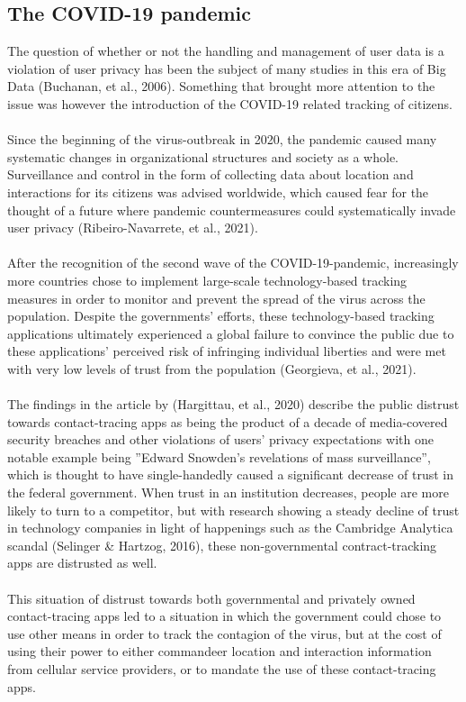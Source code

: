 \documentclass[11pt]{article}
\begin{document}
\subsection{The COVID-19 pandemic}
The question of whether or not the handling and management of user data is a violation of user privacy has been the subject of many studies in this era of Big Data (Buchanan, et al., 2006). Something that brought more attention to the issue was however the introduction of the COVID-19 related tracking of citizens.
\\ \\
Since the beginning of the virus-outbreak in 2020, the pandemic caused many systematic changes in organizational structures and society as a whole. Surveillance and control in the form of collecting data about location and interactions for its citizens was advised worldwide, which caused fear for the thought of a future where pandemic countermeasures could systematically invade user privacy (Ribeiro-Navarrete, et al., 2021). 
\\ \\
After the recognition of the second wave of the COVID-19-pandemic, increasingly more countries chose to implement large-scale technology-based tracking measures in order to monitor and prevent the spread of the virus across the population. Despite the governments’ efforts, these technology-based tracking applications ultimately experienced a global failure to convince the public due to these applications’ perceived risk of infringing individual liberties and were met with very low levels of trust from the population (Georgieva, et al., 2021). 
\\ \\
The findings in the article by (Hargittau, et al., 2020) describe the public distrust towards contact-tracing apps as being the product of a decade of media-covered security breaches and other violations of users’ privacy expectations with one notable example being ”Edward Snowden’s revelations of mass surveillance”, which is thought to have single-handedly caused a significant decrease of trust in the federal government. When trust in an institution decreases, people are more likely to turn to a competitor, but with research showing a steady decline of trust in technology companies in light of happenings such as the Cambridge Analytica scandal (Selinger & Hartzog, 2016), these non-governmental contract-tracking apps are distrusted as well.
\\ \\
This situation of distrust towards both governmental and privately owned contact-tracing apps led to a situation in which the government could chose to use other means in order to track the contagion of the virus, but at the cost of using their power to either commandeer location and interaction information from cellular service providers, or to mandate the use of these contact-tracing apps.
\end{document}
